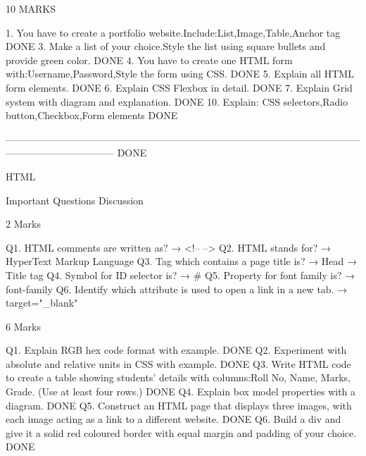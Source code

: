 10 MARKS  

1.       You have to create a portfolio website.Include:List,Image,Table,Anchor tag                                                DONE
3.       Make a list of your choice.Style the list using square bullets and provide green color.                                   DONE
4.       You have to create one HTML form with:Username,Password,Style the form using CSS.                                         DONE
5.       Explain all HTML form elements.                                                                                           DONE
6.       Explain CSS Flexbox in detail.                                                                                            DONE
7.       Explain Grid system with diagram and explanation.                                                                         DONE
10.      Explain: CSS selectors,Radio button,Checkbox,Form elements                                                                DONE                                                            

---------------------------------------------------------------------------------------------------------------------------------------------                                                                                        DONE


HTML

Important Questions Discussion

2 Marks

Q1. HTML comments are written as?
→ <!-- -->
Q2. HTML stands for?
→ HyperText Markup Language
Q3. Tag which contains a page title is?
→ Head → Title tag
Q4. Symbol for ID selector is?
→ #
Q5. Property for font family is?
→ font-family
Q6. Identify which attribute is used to open a link in a new tab.
→ target="_blank"


6 Marks

Q1. Explain RGB hex code format with example.                                                                                         DONE
Q2. Experiment with absolute and relative units in CSS with example.                                                                  DONE
Q3. Write HTML code to create a table showing students’ details with columns:Roll No, Name, Marks, Grade. (Use at least four rows.)   DONE                                                                         
Q4. Explain box model properties with a diagram.                                                                                      DONE
Q5. Construct an HTML page that displays three images, with each image acting as a link to a different website.                       DONE
Q6. Build a div and give it a solid red coloured border with equal margin and padding of your choice.                                 DONE


